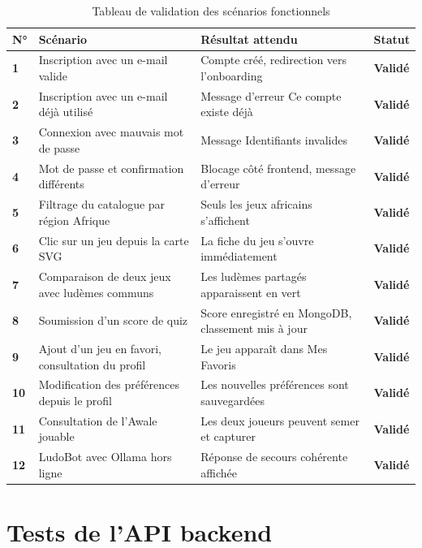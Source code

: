 \begin{table}[H]
\centering
\renewcommand{\arraystretch}{1.4}
\begin{tabularx}{\textwidth}{>{\bfseries}p{1cm} p{5cm} X >{\bfseries}p{2cm}}
\toprule
\textbf{N°} & \textbf{Scénario} & \textbf{Résultat attendu} & \textbf{Statut} \\
\midrule
1  & Inscription avec un e-mail valide
   & Compte créé, redirection vers l'onboarding & Validé \\
2  & Inscription avec un e-mail déjà utilisé
   & Message d'erreur \og{}Ce compte existe déjà\fg{} & Validé \\
3  & Connexion avec mauvais mot de passe
   & Message \og{}Identifiants invalides\fg{} & Validé \\
4  & Mot de passe et confirmation différents
   & Blocage côté frontend, message d'erreur & Validé \\
5  & Filtrage du catalogue par région \og{}Afrique\fg{}
   & Seuls les jeux africains s'affichent & Validé \\
6  & Clic sur un jeu depuis la carte SVG
   & La fiche du jeu s'ouvre immédiatement & Validé \\
7  & Comparaison de deux jeux avec ludèmes communs
   & Les ludèmes partagés apparaissent en vert & Validé \\
8  & Soumission d'un score de quiz
   & Score enregistré en MongoDB, classement mis à jour & Validé \\
9  & Ajout d'un jeu en favori, consultation du profil
   & Le jeu apparaît dans \og{}Mes Favoris\fg{} & Validé \\
10 & Modification des préférences depuis le profil
   & Les nouvelles préférences sont sauvegardées & Validé \\
11 & Consultation de l'Awale jouable
   & Les deux joueurs peuvent semer et capturer & Validé \\
12 & LudoBot avec Ollama hors ligne
   & Réponse de secours cohérente affichée & Validé \\
\bottomrule
\end{tabularx}
\caption{Tableau de validation des scénarios fonctionnels}
\label{tab:tests}
\end{table}

\section{Tests de l'API backend}

